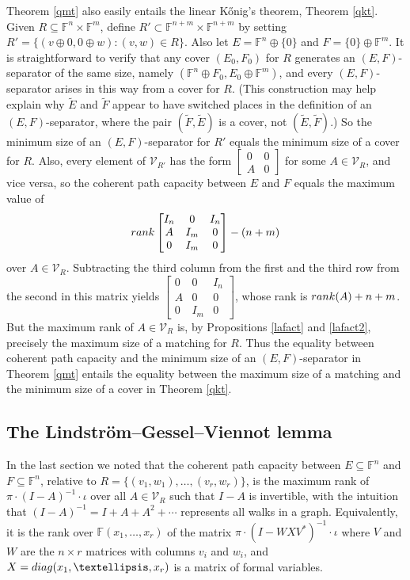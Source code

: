\documentclass[10pt,a4paper]{amsart}
\begin{document}
Theorem \ref{qmt} also easily entails the linear Kőnig's theorem, Theorem \ref{qkt}. Given $R \subseteq \mathbb{F}^n \times \mathbb{F}^m$, define $R' \subset \mathbb{F}^{n+m} \times \mathbb{F}^{n+m}$ by setting $R' = \{(v \oplus 0, 0 \oplus w): (v,w) \in R\}$. Also let $E = \mathbb{F}^n \oplus \{0\}$ and $F = \{0\} \oplus \mathbb{F}^m$. It is straightforward to verify that any cover $(E_0, F_0)$ for $R$ generates an $(E,F)$-separator of the same size, namely $(\mathbb{F}^n \oplus F_0, E_0 \oplus \mathbb{F}^m)$, and every $(E,F)$-separator arises in this way from a cover for $R$. (This construction may help explain why $\tilde{E}$ and $\tilde{F}$ appear to have switched places in the definition of an $(E,F)$-separator, where the pair $(\tilde{F}, \tilde{E})$ is a cover, not $(\tilde{E}, \tilde{F})$.)
So the minimum size of an $(E,F)$-separator for $R'$ equals the minimum size of a cover for $R$. Also, every element of $\mathcal{V}_{R'}$ has the form $\left[\begin{matrix}0&0\\ A&0\end{matrix}\right]$ for some $A \in \mathcal{V}_R$, and vice versa, so the coherent path capacity between $E$ and $F$ equals the maximum value of $${\rm rank}\left[\begin{matrix}I_n&0&I_n\\ A&I_m&0\\ 0&I_m&0\end{matrix}\right] - (n+m)$$ over $A \in \mathcal{V}_R$. Subtracting the third column from the first and the third row from the second in this matrix yields $\left[\begin{matrix}0&0&I_n\\ A&0&0\\ 0&I_m&0\end{matrix}\right]$, whose rank is ${\rm rank}(A) + n + m$. But the maximum rank of $A \in \mathcal{V}_R$ is, by Propositions \ref{lafact} and \ref{lafact2}, precisely the maximum size of a matching for $R$. Thus the equality between coherent path capacity and the minimum size of an $(E,F)$-separator in Theorem \ref{qmt} entails the equality between the maximum size of a matching and the minimum size of a cover in Theorem \ref{qkt}.

\subsection{The Lindström–Gessel–Viennot lemma}

In the last section we noted that the coherent path capacity between $E \subseteq \mathbb{F}^n$ and $F \subseteq \mathbb{F}^n$, relative to $R = \{(v_1, w_1), \ldots, (v_r, w_r)\}$, is the maximum rank of $\pi\cdot (I - A)^{-1}\cdot \iota$ over all $A \in \mathcal{V}_R$ such that $I - A$ is invertible, with the intuition that $(I - A)^{-1} = I + A + A^2 + \cdots$ represents all walks in a graph. Equivalently, it is the rank over $\mathbb{F}(x_1, \ldots, x_r)$ of the matrix $\pi\cdot (I - WXV^*)^{-1}\cdot \iota$ where $V$ and $W$ are the $n \times r$ matrices with columns $v_i$ and $w_i$, and $X = {\rm diag}(x_1, \ldots, x_r)$ is a matrix of formal variables.
\end{document}
